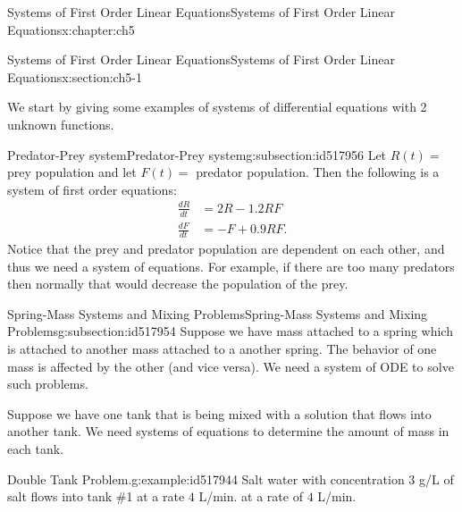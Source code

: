 \documentclass[oneside,10pt,]{book}
\numberwithin{equation}{section}
\numberwithin{equation}{section}
\newcommand{\amp}{&}
\begin{document}
\begin{chapterptx}{Systems of First Order Linear Equations}{}{Systems of First Order Linear Equations}{}{}{x:chapter:ch5}
%
%
\typeout{************************************************}
\typeout{************************************************}
%
\begin{sectionptx}{Systems of First Order Linear Equations}{}{Systems of First Order Linear Equations}{}{}{x:section:ch5-1}
\begin{introduction}{}%
We start by giving some examples of systems of differential equations with 2 unknown functions.%
\end{introduction}%
%
%
\typeout{************************************************}
\typeout{************************************************}
%
\begin{subsectionptx}{Predator-Prey system}{}{Predator-Prey system}{}{}{g:subsection:id517956}
Let \(R(t)=\) prey population and let \(F(t)=\) predator population. Then the following is a system of first order equations:%
\begin{align*}
\frac{dR}{dt} \amp = 2R-1.2RF\\
\frac{dF}{dt}  \amp = -F+0.9RF.
\end{align*}
Notice that the prey and predator population are dependent on each other, and thus we need a system of equations. For example, if there are too many predators then normally that would decrease the population of the prey.%
\end{subsectionptx}
%
%
\typeout{************************************************}
\typeout{************************************************}
%
\begin{subsectionptx}{Spring-Mass Systems and Mixing Problems}{}{Spring-Mass Systems and Mixing Problems}{}{}{g:subsection:id517954}
Suppose we have mass attached to a spring which is attached to another mass attached to a another spring. The behavior of one mass is affected by the other (and vice versa). We need a system of ODE to solve such problems.%
\par
Suppose we have one tank that is being mixed with a solution that flows into another tank. We need systems of equations to determine the amount of mass in each tank.%
\begin{example}{Double Tank Problem.}{g:example:id517944}%
Salt water with concentration \(3\) g\slash{}L of salt flows into tank \#1 at a rate \(4\) L\slash{}min. at a rate of \(4\) L\slash{}min.%

\end{example}
\end{subsectionptx}
\end{sectionptx}
\end{chapterptx}
\end{document}
